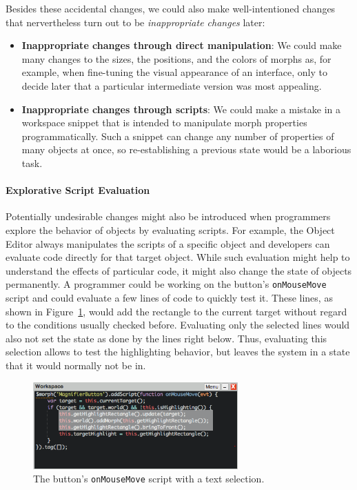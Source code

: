 Besides these accidental changes, we could also make well-intentioned changes that nervertheless turn out to be \emph{inappropriate changes} later:

\begin{itemize}
    \item \textbf{Inappropriate changes through direct manipulation}: We could make many changes to the sizes, the positions, and the colors of morphs as, for example, when fine-tuning the visual appearance of an interface, only to decide later that a particular intermediate version was most appealing.
    \item \textbf{Inappropriate changes through scripts}: We could make a mistake in a workspace snippet that is intended to manipulate morph properties programmatically. Such a snippet can change any number of properties of many objects at once, so re-establishing a previous state would be a laborious task.
\end{itemize}

\paragraph{Explorative Script Evaluation}
Potentially undesirable changes might also be introduced when programmers explore the behavior of objects by evaluating scripts.
For example, the Object Editor always manipulates the scripts of a specific object and developers can evaluate code directly for that target object.
While such evaluation might help to understand the effects of particular code, it might also change the state of objects permanently.
A programmer could be working on the button's \lstinline{onMouseMove} script and could evaluate a few lines of code to quickly test it.
These lines, as shown in Figure~\ref{fig:onMouseOverScript}, would add the rectangle to the current target without regard to the conditions usually checked before.
Evaluating only the selected lines would also not set the state as done by the lines right below.
Thus, evaluating this selection allows to test the highlighting behavior, but leaves the system in a state that it would normally not be in.

\begin{figure}[h]
    \centering
    \includegraphics[width=0.7\textwidth]{figures/3_motivation/4_workspaceDoIt.png}
    \caption{The button's \lstinline{onMouseMove} script with a text selection.}
    \label{fig:onMouseOverScript}
\end{figure}

